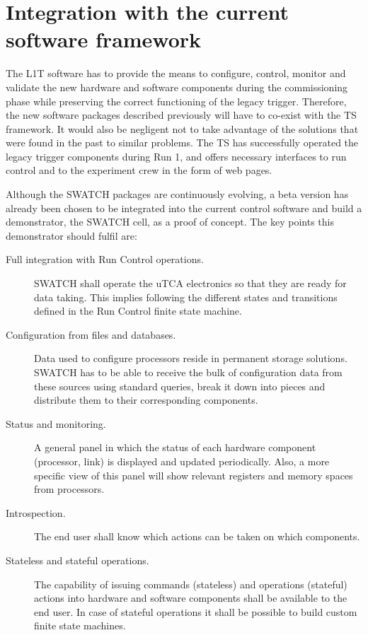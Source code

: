 \documentclass[a4paper]{jpconf}
\begin{document}
\section{Integration with the current software framework}

The L1T software has to provide the means to configure, control, monitor and validate the new hardware and software components during the commissioning phase while preserving the correct functioning of the legacy trigger. Therefore, the new software packages described previously will have to co-exist with the TS framework. It would also be negligent not to take advantage of the solutions that were found in the past to similar problems.  The TS has successfully operated the legacy trigger components during Run 1, and offers necessary interfaces to run control and to the experiment crew in the form of web pages. 

Although the SWATCH packages are continuously evolving, a beta version has already been chosen to be integrated into the current control software and build a demonstrator, the SWATCH cell, as a proof of concept. The key points this demonstrator should fulfil are:

\begin{description}
  \item[Full integration with Run Control operations.] SWATCH shall operate the uTCA electronics so that they are ready for data taking. This implies following the different states and transitions defined in the Run Control finite state machine. 
  \item[Configuration from files and databases.] Data used to configure processors reside in permanent storage solutions. SWATCH has to be able to receive the bulk of configuration data from these sources using standard queries, break it down into pieces and distribute them to their corresponding components.
  \item[Status and monitoring.] A general panel in which the status of each hardware component (processor, link) is displayed and updated periodically. Also, a more specific view of this panel will show relevant registers and memory spaces from processors. 
  \item[Introspection.] The end user shall know which actions can be taken on which components.
  \item[Stateless and stateful operations.] The capability of issuing commands (stateless) and operations (stateful) actions into hardware and software components shall be available to the end user. In case of stateful operations it shall be possible to build custom finite state machines. 
\end{description}
\end{document}
